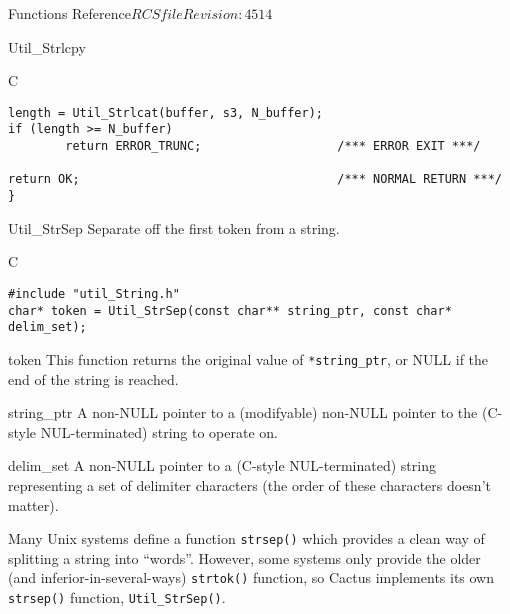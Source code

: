 \begin{cactuspart}{ Functions Reference}{$RCSfile$}{$Revision: 4514 $}
\begin{FunctionDescription}{Util\_Strlcpy}
\begin{ExampleSection}
\begin{Example}{C}
\begin{verbatim}
length = Util_Strlcat(buffer, s3, N_buffer);
if (length >= N_buffer)
        return ERROR_TRUNC;                   /*** ERROR EXIT ***/

return OK;                                    /*** NORMAL RETURN ***/
}
\end{verbatim}
\end{Example}
\end{ExampleSection}
\end{FunctionDescription}


\begin{FunctionDescription}{Util\_StrSep}
\label{Util-StrSep}
Separate off the first token from a string.

\begin{SynopsisSection}
\begin{Synopsis}{C}
\begin{verbatim}
#include "util_String.h"
char* token = Util_StrSep(const char** string_ptr, const char* delim_set);
\end{verbatim}
\end{Synopsis}
\end{SynopsisSection}

\begin{ResultSection}
\begin{Result}{token}
This function returns the original value of \verb|*string_ptr|,
or NULL if the end of the string is reached.
\end{Result}
\end{ResultSection}

\begin{ParameterSection}
\begin{Parameter}{string\_ptr}
A non-NULL pointer to a (modifyable) non-NULL pointer to the
(C-style NUL-terminated) string to operate on.
\end{Parameter}
\begin{Parameter}{delim\_set}
A non-NULL pointer to a (C-style NUL-terminated) string representing a
set of delimiter characters (the order of these characters doesn't matter).
\end{Parameter}
\end{ParameterSection}

\begin{Discussion}
Many Unix systems define a function \verb|strsep()| which provides
a clean way of splitting a string into ``words''.  However, some
systems only provide the older (and inferior-in-several-ways)
\verb|strtok()| function, so Cactus implements its own \verb|strsep()|
function, \verb|Util_StrSep()|.


\end{Discussion}
\end{FunctionDescription}
\end{cactuspart}
